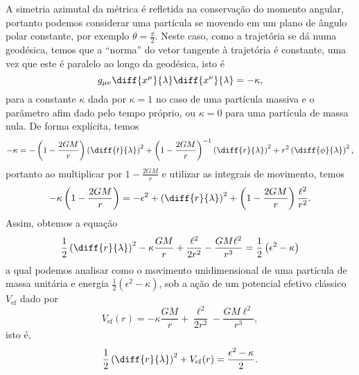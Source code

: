 A simetria azimutal da métrica é refletida na conservação do momento angular, portanto podemos considerar uma partícula se movendo em um plano de ângulo polar constante, por exemplo \(\theta = \frac{\pi}{2}\). Neste caso, como a trajetória se dá numa geodésica, temos que a \enquote{norma} do vetor tangente à trajetória é constante, uma vez que este é paralelo ao longo da geodésica, isto é
\begin{equation*}
    g_{\mu\nu}\diff{x^\mu}{\lambda} \diff{x^\nu}{\lambda} = -\kappa,
\end{equation*}
para a constante \(\kappa\) dada por \(\kappa = 1\) no caso de uma partícula massiva e o parâmetro afim dado pelo tempo próprio, ou \(\kappa = 0\) para uma partícula de massa nula. De forma explícita, temos
\begin{equation*}
    -\kappa = -\left(1 - \frac{2GM}{r}\right)\left(\diff{t}{\lambda}\right)^2 + \left(1 - \frac{2GM}{r}\right)^{-1}\left(\diff{r}{\lambda}\right)^2 + r^2\left(\diff{\phi}{\lambda}\right)^2,
\end{equation*}
portanto ao multiplicar por \(1 - \frac{2GM}{r}\) e utilizar as integrais de movimento, temos
\begin{equation*}
    -\kappa\left(1 - \frac{2GM}{r}\right) = - \epsilon^2 + \left(\diff{r}{\lambda}\right)^2 + \left(1 - \frac{2GM}{r}\right)\frac{\ell^2}{r^2}.
\end{equation*}
Assim, obtemos a equação
\begin{equation*}
    \frac12\left(\diff{r}{\lambda}\right)^2 - \kappa \frac{GM}{r} + \frac{\ell^2}{2r^2} - \frac{GM\ell^2}{r^3} = \frac12 \left(\epsilon^2 - \kappa\right)
\end{equation*}
a qual podemos analisar como o movimento unidimensional de uma partícula de massa unitária  e energia \(\frac12 \left(\epsilon^2 - \kappa\right)\), sob a ação de um potencial efetivo clássico \(V_\mathrm{ef}\) dado por
\begin{equation*}
    V_\mathrm{ef}(r) = - \kappa \frac{GM}{r} + \frac{\ell^2}{2r^2} - \frac{GM\ell^2}{r^3},
\end{equation*}
isto é,
\begin{equation*}
    \frac12 \left(\diff{r}{\lambda}\right)^2 + V_\mathrm{ef}(r) = \frac{\epsilon^2 - \kappa}2.
\end{equation*}
